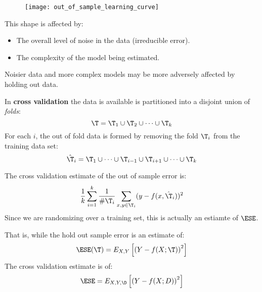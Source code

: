 %
%
\begin{frame}
  \begin{figure}
    \texttt{[image: out\_of\_sample\_learning\_curve]}
  \end{figure}
  This shape is affected by:
  \begin{itemize}
    \item The overall level of noise in the data (irreducible error).
    \item The complexity of the model being estimated.
  \end{itemize}
  Noisier data and more complex models may be more adversely affected by holding
  out data.
\end{frame}
%
%
\begin{frame}
  In \textbf{cross validation} the data is available is partitioned into a
  disjoint union of \textit{folds}:
  $$ {\T} = {\T}_1 \cup {\T}_2 \cup \cdots \cup {\T}_k $$
  For each $i$, the out of fold data is formed by removing the fold ${\T}_i$ from
  the training data set:
  $$ \hat{{\T}}_i = {\T}_1 \cup \cdots \cup {\T}_{i-1} \cup {\T}_{i+1}
  \cup \cdots \cup {\T}_k $$
\end{frame}
%
%
\begin{frame}
  The cross validation estimate of the out of sample error is:
   $$ \frac{1}{k} \sum_{i=1}^{k} \frac{1}{\# {\T}_i } \sum_{x,y \in
   {\T}_i} (y - f(x, \hat{{\T}}_i))^2$$ 
   Since we are randomizing over a training set, this is actually an estiamte of
   $\ESE$.
\end{frame}
%
%
\begin{frame}
  That is, while the hold out sample error is an estimate of:
  $$\ESE(\T) = E_{X,Y} \left[ \left( Y - f(X; \T) \right)^2 \right]$$
  The cross validation estimate is of:
  $$\ESE = E_{X,Y,\D} \left[ \left( Y - f(X; D) \right)^2 \right]$$
\end{frame}








